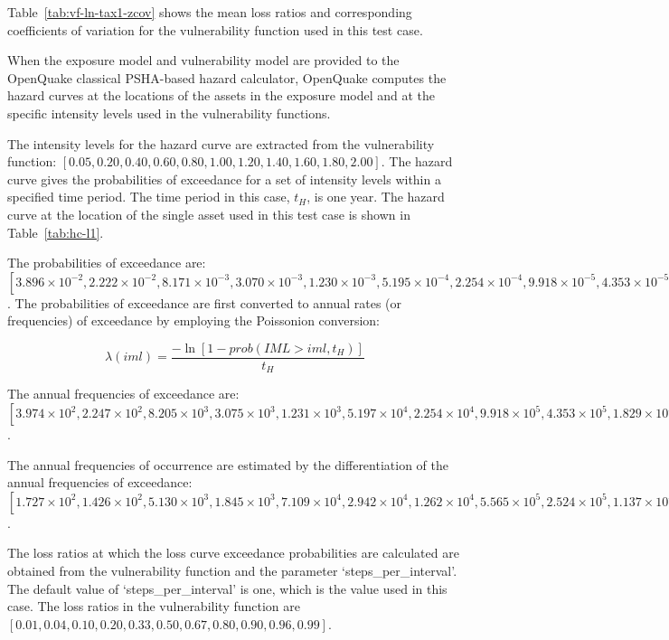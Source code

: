 Table~\ref{tab:vf-ln-tax1-zcov} shows the mean loss ratios and corresponding coefficients of variation for the vulnerability function used in this test case.

When the exposure model and vulnerability model are provided to the OpenQuake classical PSHA-based hazard calculator, OpenQuake computes the hazard curves at the locations of the assets in the exposure model and at the specific intensity levels used in the vulnerability functions.



The intensity levels for the hazard curve are extracted from the vulnerability function: $[0.05, 0.20, 0.40, 0.60, 0.80, 1.00, 1.20, 1.40, 1.60, 1.80, 2.00]$. The hazard curve gives the probabilities of exceedance for a set of intensity levels within a specified time period. The time period in this case, $t_H$, is one year. The hazard curve at the location of the single asset used in this test case is shown in Table~\ref{tab:hc-l1}.

The probabilities of exceedance are: $[3.896\times10^{-2}, 2.222\times10^{-2}, 8.171\times10^{-3}, 3.070\times10^{-3}, 1.230\times10^{-3}, 5.195\times10^{-4}, 2.254\times10^{-4}, 9.918\times10^{-5}, 4.353\times10^{-5}, 1.830\times10^{-5}, 6.925\times10^{-6}]$. The probabilities of exceedance are first converted to annual rates (or frequencies) of exceedance by employing the Poissonion conversion:

\begin{equation}
	\lambda(iml) = \frac{-\ln [1 - prob(IML > iml, t_H)]}{t_H}
\end{equation}

The annual frequencies of exceedance are: $[3.974\times10^{2}, 2.247\times10^{2}, 8.205\times10^{3}, 3.075\times10^{3}, 1.231\times10^{3}, 5.197\times10^{4}, 2.254\times10^{4}, 9.918\times10^{5}, 4.353\times10^{5}, 1.829\times10^{5}, 6.925\times10^{6}]$.

The annual frequencies of occurrence are estimated by the differentiation of the annual frequencies of exceedance: $[1.727\times10^{2}, 1.426\times10^{2}, 5.130\times10^{3}, 1.845\times10^{3}, 7.109\times10^{4}, 2.942\times10^{4}, 1.262\times10^{4}, 5.565\times10^{5}, 2.524\times10^{5}, 1.137\times10^{5}]$.

The loss ratios at which the loss curve exceedance probabilities are calculated are obtained from the vulnerability function and the parameter `steps\_per\_interval'. The default value of `steps\_per\_interval' is one, which is the value used in this case. The loss ratios in the vulnerability function are $[0.01, 0.04, 0.10, 0.20, 0.33, 0.50, 0.67, 0.80, 0.90, 0.96, 0.99]$.

